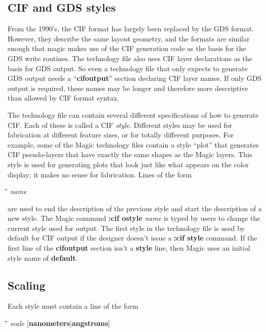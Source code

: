 \documentclass[letterpaper,twoside,12pt]{article}
\def\hinch{\hspace*{0.5in}}
\def\starti{\begin{center}\begin{tabbing}\hinch\=\hinch\=\hinch\=\hinch\=\kill}
\def\endi{\end{tabbing}\end{center}}
\def\ii{\>\>\>}
\def\vbar{$|$}
\begin{document}
\subsection{CIF and GDS styles}

From the 1990's, the CIF format has largely been replaced by the
GDS format.  However, they describe the same layout geometry,
and the formats are similar enough that magic makes use of the CIF 
generation code as the basis for the GDS write routines.  The
technology file also uses CIF layer declarations as the basis
for GDS output.  So even a technology file that only expects to
generate GDS output needs a ``{\bfseries cifoutput}'' section
declaring CIF layer names.  If only GDS output is required, these
names may be longer and therefore more descriptive than allowed
by CIF format syntax.

The technology file can contain several different specifications
of how to generate CIF.  Each of these is called a CIF
{\itshape style}.  Different styles may be used for fabrication at
different feature sizes, or for totally different purposes.  For
example, some of the Magic technology files contain a style
``plot'' that generates CIF pseudo-layers that have exactly the
same shapes as the Magic layers.  This style is used for generating
plots that look just like what appears on the color display;  it
makes no sense for fabrication.  Lines of the form

\starti
   \ii {\bfseries style} {\itshape name}
\endi

are used to end the description of the previous style and start
the description of a new style.  The Magic command
{\bfseries :cif ostyle} {\itshape name} is typed by users to change
the current style used for output.  The first style in the
technology file is used by default for CIF output if the
designer doesn't issue a {\bfseries :cif style} command.
If the first line of the {\bfseries cifoutput}
section isn't a {\bfseries style} line, then Magic uses an initial style
name of {\bfseries default}.

\subsection{Scaling}

Each style must contain a line of the form

\starti
   \ii {\bfseries scalefactor} {\itshape scale}
       [{\bfseries nanometers}\vbar {\bfseries angstroms}]
\endi
\end{document}
